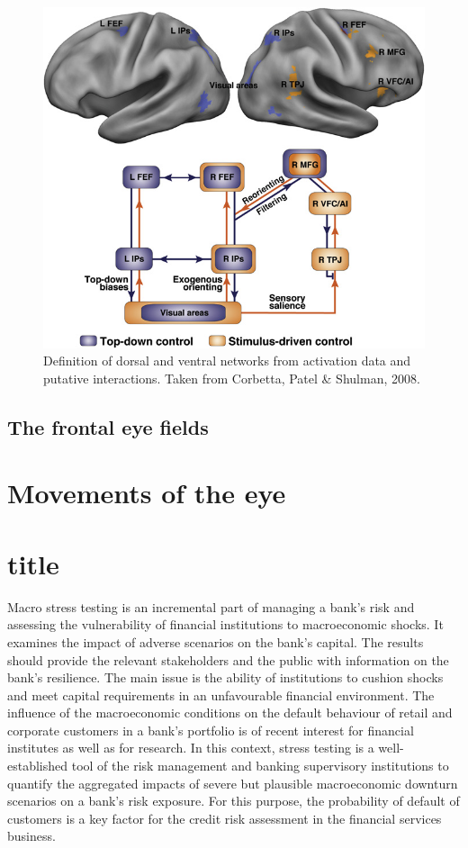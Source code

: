 \documentclass[a4paper, 11pt]{scrreprt}
\begin{document}
\begin{figure}
	\includegraphics[scale=0.4]{img/attentionnetworks.png}
	\caption[Dorsal and ventral attention networks]
	{\small{Definition of dorsal and ventral networks from activation data and putative interactions. Taken from Corbetta, Patel \& Shulman, 2008.}}
	\label{fig:Networks}
\end{figure}

\subsection{The frontal eye fields}
\section{Movements of the eye}

\section{title}

Macro stress testing is an incremental part of managing a bank's risk and assessing the vulnerability of financial institutions to macroeconomic shocks. 
It examines the impact of adverse scenarios on the bank's capital. 
The results should provide the relevant stakeholders and the public with information on the bank's resilience. The main issue is the ability of institutions to cushion shocks and meet capital requirements in an unfavourable financial environment.
The influence of the macroeconomic conditions on the default behaviour of retail and corporate customers in a bank's portfolio is of recent interest for financial institutes as well as for research. In this context, stress testing is a well-established tool of the risk management and banking supervisory institutions to quantify the aggregated impacts of severe but plausible macroeconomic downturn scenarios on a bank's risk exposure.
For this purpose, the probability of default of customers is a key factor for the credit risk assessment in the financial services business.
\end{document}
